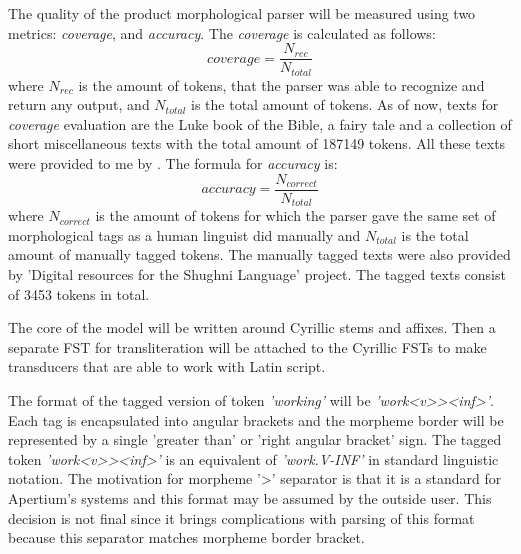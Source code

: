 \par The quality of the product morphological parser will be measured using two metrics: \textit{coverage}, and \textit{accuracy}. The \textit{coverage} is calculated as follows: \[coverage = \frac{N_{rec}}{N_{total}}\] where $N_{rec}$ is the amount of tokens, that the parser was able to recognize and return any output, and $N_{total}$ is the total amount of tokens. As of now, texts for \textit{coverage} evaluation are the Luke book of the Bible, a fairy tale and a collection of short miscellaneous texts with the total amount of 187149 tokens. All these texts were provided to me by \textcite{makarov_digital_2022}. The formula for \textit{accuracy} is: \[accuracy = \frac{N_{correct}}{N_{total}}\] where $N_{correct}$ is the amount of tokens for which the parser gave the same set of morphological tags as a human linguist did manually and $N_{total}$ is the total amount of manually tagged tokens. The manually tagged texts were also provided by 'Digital resources for the Shughni Language' project. The tagged texts consist of 3453 tokens in total.
\par The core of the model will be written around Cyrillic stems and affixes. Then a separate FST for transliteration will be attached to the Cyrillic FSTs to make transducers that are able to work with Latin script.
\par The format of the tagged version of token \textit{'working'} will be \textit{'work<v>{}><inf>'}. Each tag is encapsulated into angular brackets and the morpheme border will be represented by a single 'greater than' or 'right angular bracket' sign. The tagged token \textit{'work<v>{}><inf>'} is an equivalent of \textit{'work.V-INF'} in standard linguistic notation. The motivation for morpheme '>' separator is that it is a standard for Apertium's systems and this format may be assumed by the outside user. This decision is not final since it brings complications with parsing of this format because this separator matches morpheme border bracket.